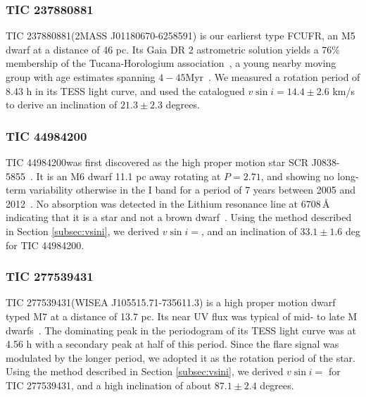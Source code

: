\documentclass[fleqn,usenatbib,letters]{mnras}%
\newcommand{\FA}{TIC 277539431} %
\newcommand{\FB}{TIC 44984200} %
\newcommand{\FC}{TIC 237880881} %
\begin{document}
\subsubsection{\FC}
\label{sec:propsC}
\FC\;(2MASS J01180670-6258591) is our earlierst type FCUFR, an M5 dwarf at a distance of 46 pc. Its Gaia DR 2 astrometric solution yields a 76\% membership of the Tucana-Horologium association~\citep{ujjwal2020}, a young nearby moving group with age estimates spanning $4-45$\;Myr~\citep{ujjwal2020, bell2015, kraus2014}. We measured a rotation period of 8.43 h in its TESS light curve, and used the catalogued $v\sin i=14.4\pm2.6$ km/s~\citep{kraus2014} to derive an inclination of $21.3\pm2.3$ degrees.
\subsubsection{\FB}
\label{sec:propsB}
\FB\;was first discovered as the high proper motion star SCR J0838-5855~\citep{finch2007}. It is an M6 dwarf 11.1 pc away rotating at $P=2.71$, and showing no long-term variability otherwise in the I band for a period of 7 years between 2005 and 2012~\citep{hosey2015}. No absorption was detected in the Lithium resonance line at $6708$\,\AA\; indicating that it is a star and not a brown dwarf~\citep{phanbao2017}. Using the method described in Section \ref{subsec:vsini}, we derived $v\sin i=$, and an inclination of $33.1\pm1.6$ deg for \FB.
\subsubsection{\FA}
\label{sec:propsA}
\FA\;(WISEA J105515.71-735611.3) is a high proper motion dwarf~\citep{schneider2016} typed M7 at a distance of 13.7 pc. Its near UV flux was typical of mid- to late M dwarfs~\citep{schneider2018}. The dominating peak in the periodogram of its TESS light curve was at 4.56 h with a secondary peak at half of this period. Since the flare signal was modulated by the longer period, we adopted it as the rotation period of the star. Using the method described in Section \ref{subsec:vsini}, we derived $v\sin i=$ for \FA, and a high inclination of about $87.1\pm2.4$ degrees.
\end{document}
